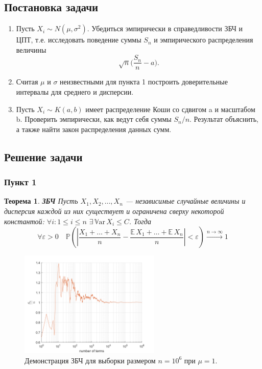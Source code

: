 \documentclass[oneside, final, 12pt]{article}
\def\Var{{\mathbb{V}\textrm{ar}}\,}
\def\E{{\mathbb{E} }\,}
\def\P{{\mathbb{P} }}
\newtheorem{theorem}{Теорема}
\begin{document}
\subsection{Постановка задачи}
    \begin{enumerate} 
        \item Пусть $X_i \sim N(\mu, \sigma^2)$. Убедиться эмпирически в справедливости ЗБЧ и ЦПТ,
			 т.е. исследовать поведение суммы $S_n$ и эмпирического распределения величины 
			$$\sqrt{n}\Big( \dfrac{S_n}{n} - a\Big).$$
        \item Считая $\mu$ и $\sigma$ неизвестными для пункта 1 построить доверительные интервалы
			для среднего и дисперсии. 
        \item Пусть $X_i \sim K(a, b)$ имеет распределение Коши со сдвигом a и масштабом b. 
			Проверить эмпирически, как ведут себя суммы $S_n/n$. Результат объяснить,
			а также найти закон распределения данных сумм.
    \end{enumerate}
\subsection{Решение задачи}
\subsubsection{Пункт 1}

	\begin{theorem}{\textbf{ЗБЧ}}
    	\newline
        Пусть $X_1, X_2, \ldots, X_n$ --- независимые случайные величины и дисперсия  каждой из них существует
		и ограничена сверху некоторой константой: $\forall i: 1\leqslant i \leqslant n$ $\exists \, \Var X_i \leqslant C$. 
		Тогда
        $$
            \forall \varepsilon>0  \quad 
			\P\left(\left| \dfrac{X_1 + \ldots + X_n }{n} - \dfrac{\E X_1 + \ldots + \E X_n }{n}  \right| <
																																		 \varepsilon \right) 
            \xrightarrow[]{n \rightarrow \infty} 1
        $$
    \end{theorem}

	\begin{figure}[h!]
		\centering
		\includegraphics[width=0.6\textwidth]{../code/Task_5/pict/LLN_ex.png}
		\caption{Демонстрация ЗБЧ для выборки размером $n=10^6$ при $\mu = 1$.}
    \end{figure}
\end{document}
